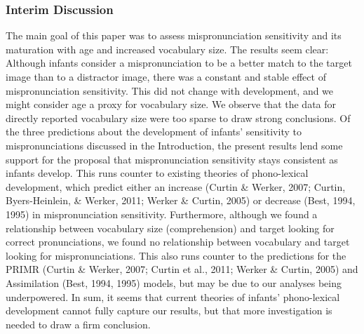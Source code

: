\documentclass[man]{apa6}
\theoremstyle{definition}
\theoremstyle{definition}
\theoremstyle{definition}
\theoremstyle{remark}
\begin{document}
\subsubsection{Interim Discussion}\label{interim-discussion}

The main goal of this paper was to assess mispronunciation sensitivity
and its maturation with age and increased vocabulary size. The results
seem clear: Although infants consider a mispronunciation to be a better
match to the target image than to a distractor image, there was a
constant and stable effect of mispronunciation sensitivity. This did not
change with development, and we might consider age a proxy for
vocabulary size. We observe that the data for directly reported
vocabulary size were too sparse to draw strong conclusions. Of the three
predictions about the development of infants' sensitivity to
mispronunciations discussed in the Introduction, the present results
lend some support for the proposal that mispronunciation sensitivity
stays consistent as infants develop. This runs counter to existing
theories of phono-lexical development, which predict either an increase
(Curtin \& Werker, 2007; Curtin, Byers-Heinlein, \& Werker, 2011; Werker
\& Curtin, 2005) or decrease (Best, 1994, 1995) in mispronunciation
sensitivity. Furthermore, although we found a relationship between
vocabulary size (comprehension) and target looking for correct
pronunciations, we found no relationship between vocabulary and target
looking for mispronunciations. This also runs counter to the predictions
for the PRIMR (Curtin \& Werker, 2007; Curtin et al., 2011; Werker \&
Curtin, 2005) and Assimilation (Best, 1994, 1995) models, but may be due
to our analyses being underpowered. In sum, it seems that current
theories of infants' phono-lexical development cannot fully capture our
results, but that more investigation is needed to draw a firm
conclusion.
\end{document}
